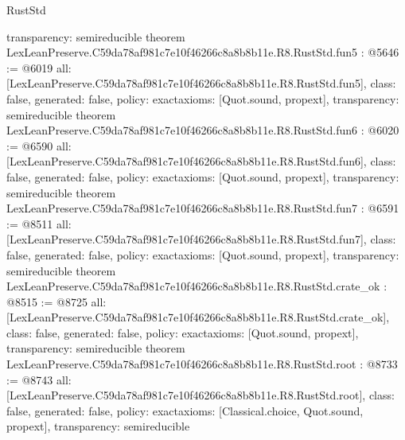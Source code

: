 \begin{lexlean}{RustStd}
\begin{coremodule}
{  transparency: semireducible
}
theorem LexLeanPreserve.C59da78af981c7e10f46266c8a8b8b11e.R8.RustStd.fun5 : @5646 := @6019 {
  all: [LexLeanPreserve.C59da78af981c7e10f46266c8a8b8b11e.R8.RustStd.fun5],
  class: false,
  generated: false,
  policy: exact{axioms: [Quot.sound, propext]},
  transparency: semireducible
}
theorem LexLeanPreserve.C59da78af981c7e10f46266c8a8b8b11e.R8.RustStd.fun6 : @6020 := @6590 {
  all: [LexLeanPreserve.C59da78af981c7e10f46266c8a8b8b11e.R8.RustStd.fun6],
  class: false,
  generated: false,
  policy: exact{axioms: [Quot.sound, propext]},
  transparency: semireducible
}
theorem LexLeanPreserve.C59da78af981c7e10f46266c8a8b8b11e.R8.RustStd.fun7 : @6591 := @8511 {
  all: [LexLeanPreserve.C59da78af981c7e10f46266c8a8b8b11e.R8.RustStd.fun7],
  class: false,
  generated: false,
  policy: exact{axioms: [Quot.sound, propext]},
  transparency: semireducible
}
theorem LexLeanPreserve.C59da78af981c7e10f46266c8a8b8b11e.R8.RustStd.crate_ok : @8515 := @8725 {
  all: [LexLeanPreserve.C59da78af981c7e10f46266c8a8b8b11e.R8.RustStd.crate_ok],
  class: false,
  generated: false,
  policy: exact{axioms: [Quot.sound, propext]},
  transparency: semireducible
}
theorem LexLeanPreserve.C59da78af981c7e10f46266c8a8b8b11e.R8.RustStd.root : @8733 := @8743 {
  all: [LexLeanPreserve.C59da78af981c7e10f46266c8a8b8b11e.R8.RustStd.root],
  class: false,
  generated: false,
  policy: exact{axioms: [Classical.choice, Quot.sound, propext]},
  transparency: semireducible
}


\end{coremodule}
\end{lexlean}
